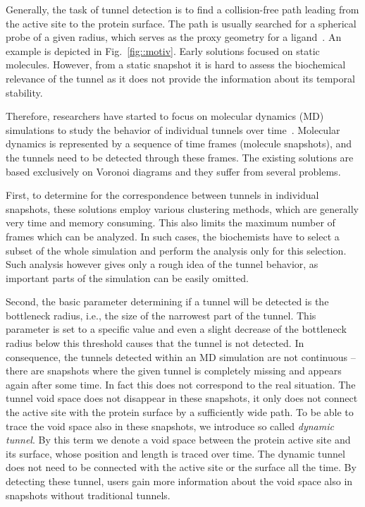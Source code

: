 \documentclass[usletter, 10pt, conference]{svjour3}      %
\begin{document}
Generally, the task of tunnel detection is to find a collision-free path leading from the active site to the protein surface. 
The path is usually searched for a spherical probe of a given radius, which serves as the proxy geometry for a ligand~\cite{caver3,sehnal2013mole,kozlikova2014ca}.
An example is depicted in Fig.~\ref{fig::motiv}.
Early solutions focused on static molecules. 
However, from a static snapshot it is hard to assess the biochemical relevance of the tunnel as it does not provide the information about its temporal stability. 

Therefore, researchers have started to focus on molecular dynamics (MD) simulations to study the behavior of individual tunnels over time~\cite{yaffe2008,caver3,sehnal2013mole,jurcik2016accelerated}.
Molecular dynamics is represented by a sequence of time frames (molecule snapshots), and the tunnels need to be detected through these frames.
The existing solutions are based exclusively on Voronoi diagrams and they suffer from several problems.

First, to determine for the correspondence between tunnels in individual snapshots, these solutions employ various clustering methods, which are generally very time and memory consuming.
This also limits the maximum number of frames which can be analyzed.
In such cases, the biochemists have to select a subset of the whole simulation and perform the analysis only for this selection.
Such analysis however gives only a rough idea of the tunnel behavior, as important parts of the simulation can be easily omitted.

Second, the basic parameter determining if a tunnel will be detected is the bottleneck radius, i.e., the size of the narrowest part of the tunnel. 
This parameter is set to a specific value and even a slight decrease of the bottleneck radius below this threshold causes that the tunnel is not detected.
In consequence, the tunnels detected within an MD simulation are not continuous -- there are snapshots where the given tunnel is completely missing and appears again after some time.
In fact this does not correspond to the real situation. 
The tunnel void space does not disappear in these snapshots, it only does not connect the active site with the protein surface by a sufficiently wide path.
To be able to trace the void space also in these snapshots, we introduce so called {\it dynamic tunnel}.
By this term we denote a void space between the protein active site and its surface, whose position and length is traced over time.
The dynamic tunnel does not need to be connected with the active site or the surface all the time.
By detecting these tunnel, users gain more information about the void space also in snapshots without traditional tunnels.
\end{document}

